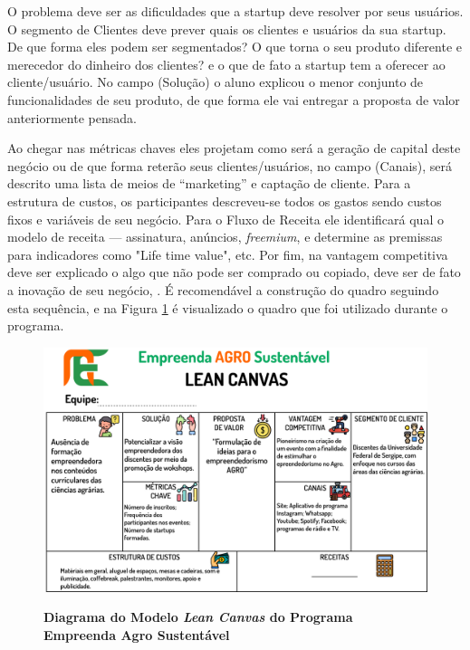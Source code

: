 O problema deve ser as dificuldades que a startup deve resolver por seus usuários. O segmento de Clientes deve prever quais os clientes e usuários da sua startup. De que forma eles podem ser segmentados? O que torna o seu produto diferente e merecedor do dinheiro dos clientes? e o que de fato a startup tem a oferecer ao cliente/usuário. No campo (Solução) o aluno explicou o menor conjunto de funcionalidades de seu produto, de que forma ele vai entregar a proposta de valor anteriormente pensada.

Ao chegar nas métricas chaves eles projetam como será a geração de capital deste negócio ou de que forma reterão seus clientes/usuários, no campo (Canais), será descrito uma lista de meios de “marketing” e captação de cliente. Para a estrutura de custos, os participantes descreveu-se todos os gastos sendo custos fixos e variáveis de seu negócio. Para o Fluxo de Receita ele identificará qual o modelo de receita — assinatura, anúncios, \textit{freemium}, e determine as premissas para indicadores como "Life time value", etc. Por fim, na vantagem competitiva deve ser explicado o algo que não pode ser comprado ou copiado, deve ser de fato a inovação de seu negócio,  \cite{maurya_running_2012, sebrae_aprenda_2019}. É recomendável a construção do quadro seguindo esta sequência, e na Figura \ref{figura_7} é visualizado o quadro que foi utilizado durante o programa.



\begin{figure}[h!]
\centering
\caption{\textbf{Diagrama do Modelo  \textit{Lean Canvas} do Programa Empreenda Agro Sustentável}}
\includegraphics[scale=0.1]{Imagens/canvas.png}
\label{figura_7}
\end{figure}


